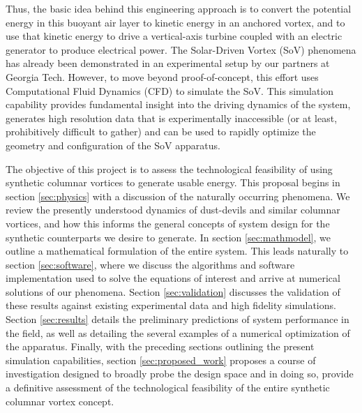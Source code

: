 Thus, the basic idea behind this engineering approach is to convert the 
potential energy in this buoyant air layer to kinetic energy in an
anchored vortex, and to use that kinetic energy to drive a
vertical-axis turbine coupled with an electric generator  to
produce electrical power. 
The Solar-Driven Vortex (SoV) phenomena has already been demonstrated in
an experimental setup by our partners at Georgia Tech. However,  to 
move beyond proof-of-concept, this effort uses Computational Fluid 
Dynamics (CFD) to simulate the SoV. This simulation capability provides 
fundamental insight into the 
driving dynamics of the system, generates high resolution data that is 
experimentally inaccessible (or at least, prohibitively difficult to gather) 
and can be used to rapidly optimize the geometry and configuration of 
the SoV apparatus. 


%
%

The objective of this project is to assess the technological feasibility of 
using synthetic columnar vortices to generate usable energy. 
This proposal begins in section \ref{sec:physics} with a discussion of the 
naturally occurring phenomena. We 
review the presently understood dynamics of dust-devils and similar
columnar vortices, and how this informs the general concepts of system 
design for the synthetic counterparts we desire to generate. 
In section \ref{sec:mathmodel}, we outline a mathematical formulation of
the entire system. This leads naturally to section \ref{sec:software},
where we discuss the algorithms and software implementation used to
solve the equations of interest and arrive at numerical
solutions of our phenomena. Section \ref{sec:validation} discusses the
validation of these results against existing experimental data and high
fidelity simulations. Section \ref{sec:results} details the preliminary
predictions of system performance in the field, as well as detailing the 
several examples of a numerical optimization of the apparatus. Finally, with the 
preceding sections outlining the present simulation capabilities, 
section \ref{sec:proposed_work} proposes a course of investigation
designed to broadly probe the design space and in doing so, provide a
definitive assessment of the technological feasibility of the entire 
synthetic columnar vortex concept. 


